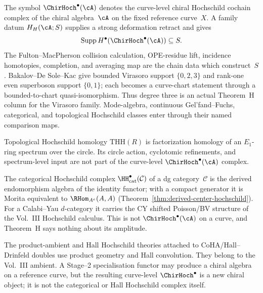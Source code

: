 \begin{remark}
\label{rem:theorem-H-reference-curve-lane}
The symbol $\ChirHoch^\bullet(\cA)$ denotes the curve-level chiral
Hochschild cochain complex of the chiral algebra~$\cA$ on the fixed
reference curve~$X$.  A family datum $H_H(\cA;S)$ supplies a strong
deformation retract and gives
\[
 \operatorname{Supp}H^\bullet(\ChirHoch^\bullet(\cA))\subseteq S.
\]
The Fulton--MacPherson collision calculation, OPE-residue lift,
incidence homotopies, completion, and averaging map are the chain data
which construct~$S$.  Bakalov--De Sole--Kac give bounded Virasoro
support $\{0,2,3\}$ and rank-one even superboson support $\{0,1\}$;
each becomes a curve-chart statement through a bounded-to-chart
quasi-isomorphism.  Thus degree three is an actual Theorem~H column
for the Virasoro family.  Mode-algebra, continuous
Gel'fand--Fuchs, categorical, and topological Hochschild classes enter
through their named comparison maps.
\end{remark}

\begin{remark}
\label{rem:excluded-hochschild-theories}
Topological Hochschild homology
$\mathrm{THH}(R)$ is factorization homology of an $E_1$-ring spectrum
over the circle. Its circle action, cyclotomic refinements, and
spectrum-level input are not part of the curve-level
$\ChirHoch^\bullet(\cA)$ complex.

The categorical Hochschild complex
$\HH^\bullet_{\mathrm{cat}}(\mathcal C)$ of a dg category~$\mathcal C$
is the derived endomorphism algebra of the identity functor; with a
compact generator it is Morita equivalent to
$\RHom_{A^e}(A,A)$
(Theorem~\ref{thm:derived-center-hochschild}). For a
Calabi--Yau $d$-category it carries the CY shifted Poisson/BV
structure of the Vol.~III Hochschild calculus. This is not
$\ChirHoch^\bullet(\cA)$ on a curve, and Theorem~H says nothing about
its amplitude.

The product-ambient and Hall Hochschild theories attached to
CoHA/Hall--Drinfeld doubles use product geometry and Hall
convolution. They belong to the Vol.~III ambient. A Stage--2
specialisation functor may produce a chiral algebra on a reference
curve, but the resulting curve-level $\ChirHoch^\bullet$ is a new
chiral object; it is not the categorical or Hall Hochschild complex
itself.
\end{remark}

